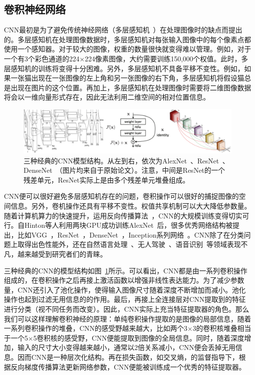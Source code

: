 \subsection{卷积神经网络}
CNN最初是为了避免传统神经网络（多层感知机~\cite{gardner1998artificial}）在处理图像时的缺点而提出的。多层感知机在处理图像数据时，多层感知机对每张输入图像中的每个像素点都使用一个感知器。对于较大的图像，权重的数量很快就变得难以管理。例如，对于一个有3个彩色通道的224$\times$224像素图像，大约需要训练150,000个权值。此时，多层感知机的训练将变得十分困难。另外，多层感知机不具备平移不变性。例如，如果一张猫出现在一张图像的左上角和另一张图像的右下角，多层感知机将假设猫总是出现在图片的这个位置。再加上，多层感知机在处理图像时需要将二维图像数据将会以一维向量形式存在，因此无法利用二维空间的相对位置信息。
\begin{figure}[h]
	\centering
	\includegraphics[width=1.0\textwidth]{figure/popular_networks}
	\caption{三种经典的CNN模型结构。从左到右，依次为AlexNet~\cite{krizhevsky2012imagenet}、ResNet~\cite{he2016deep, he2016identity}、DenseNet~\cite{huang2017densely}（图片均来自于原始论文）。注意，中间是ResNet的一个残差单元，ResNet实际上是由多个残差单元堆叠组成。} 
	\label{fig:popular_networks}
\end{figure}

CNN便可以很好避免多层感知机存在的问题，卷积操作可以很好的捕捉图像的空间信息。另外，卷机操作还具有平移不变性。权值共享机制可以大大降低参数量。随着计算机算力的快速提升，运用反向传播算法~\cite{hecht1992theory}，CNN的大规模训练变得切实可行。自Hinton等人利用两块GPU成功训练AlexNet~\cite{krizhevsky2012imagenet}后，很多优秀网络结构被提出，比如VGG~\cite{simonyan2014very}，ResNet~\cite{he2016deep, he2016identity}，DenseNet~\cite{huang2017densely}，Inception系列网络~\cite{szegedy2015going, szegedy2016rethinking, szegedy2017inception}。CNN除了在分类问题上取得出色性能外，还在自然语言处理~\cite{dos2014deep, mou2016convolutional, li2019knowledge}、无人驾驶~\cite{lee2017deep, csillik2018identification, tang2017vehicle}、语音识别~\cite{abdel2013exploring, swietojanski2014convolutional, robertson2019exploring}等领域表现不凡，越来越受到研究者们的青睐。

三种经典的CNN的模型结构如图~\ref{fig:popular_networks}所示。可以看出，CNN都是由一系列卷积操作组成的，在卷积操作之后再接上激活函数以增强非线性表达能力。为了减少参数量，CNN还引入了池化操作，使得输入图像尺寸随着深度不断增加而减小。池化操作也起到过滤无用信息的的作用。最后，再接上全连接层对CNN提取到的特征进行分类（视不同任务而改变）。因此，CNN实际上充当特征提取器的角色。那么我们可以这样理解卷积神经的原理：单纯卷积操作提取的是图像的局部信息，随着一系列卷积操作的堆叠，CNN的感受野越来越大，比如两个3$\times$3的卷积核堆叠相当于一个5$\times$5卷积核的感受野，CNN便能提取到图像的全局信息。同时，随着深度增加，输入的尺寸大小变得越来越小，通常以2倍关系减小，CNN便会丢掉无用信息。因而CNN是一种层次化结构。再在损失函数，如交叉熵，的监督指导下，根据反向梯度传播算法更新网络参数，CNN便能被训练成一个优秀的特征提取器。


